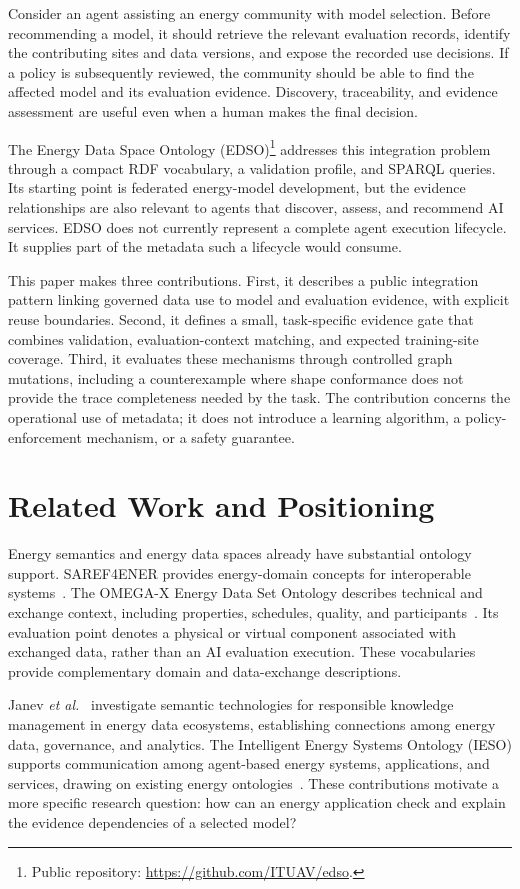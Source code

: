 \documentclass[conference]{IEEEtran}
\begin{document}
Consider an agent assisting an energy community with model selection. Before recommending a model, it should retrieve the relevant evaluation records, identify the contributing sites and data versions, and expose the recorded use decisions. If a policy is subsequently reviewed, the community should be able to find the affected model and its evaluation evidence. Discovery, traceability, and evidence assessment are useful even when a human makes the final decision.

The Energy Data Space Ontology (EDSO)\footnote{Public repository: \url{https://github.com/ITUAV/edso}.} addresses this integration problem through a compact RDF vocabulary, a validation profile, and SPARQL queries. Its starting point is federated energy-model development, but the evidence relationships are also relevant to agents that discover, assess, and recommend AI services. EDSO does not currently represent a complete agent execution lifecycle. It supplies part of the metadata such a lifecycle would consume.

This paper makes three contributions. First, it describes a public integration pattern linking governed data use to model and evaluation evidence, with explicit reuse boundaries. Second, it defines a small, task-specific evidence gate that combines validation, evaluation-context matching, and expected training-site coverage. Third, it evaluates these mechanisms through controlled graph mutations, including a counterexample where shape conformance does not provide the trace completeness needed by the task. The contribution concerns the operational use of metadata; it does not introduce a learning algorithm, a policy-enforcement mechanism, or a safety guarantee.

\section{Related Work and Positioning}
Energy semantics and energy data spaces already have substantial ontology support. SAREF4ENER provides energy-domain concepts for interoperable systems~\cite{saref}. The OMEGA-X Energy Data Set Ontology describes technical and exchange context, including properties, schedules, quality, and participants~\cite{omegax}. Its evaluation point denotes a physical or virtual component associated with exchanged data, rather than an AI evaluation execution. These vocabularies provide complementary domain and data-exchange descriptions.

Janev \emph{et al.}~\cite{janev} investigate semantic technologies for responsible knowledge management in energy data ecosystems, establishing connections among energy data, governance, and analytics. The Intelligent Energy Systems Ontology (IESO) supports communication among agent-based energy systems, applications, and services, drawing on existing energy ontologies~\cite{ieso}. These contributions motivate a more specific research question: how can an energy application check and explain the evidence dependencies of a selected model?
\end{document}
